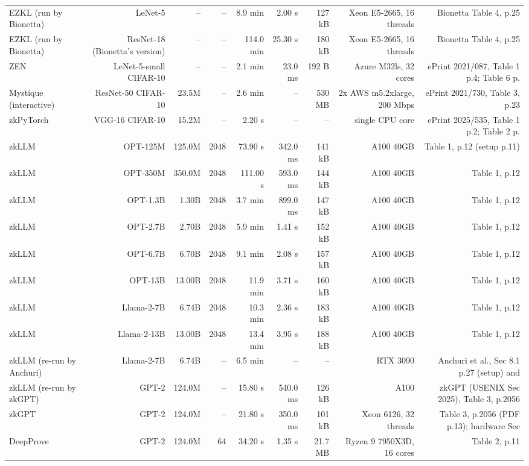 \begin{tabular}{lrrrrrrrr}
EZKL (run by Bionetta) & LeNet-5 & – & – & 8.9 min & 2.00 s & 127 kB & Xeon E5-2665, 16 threads & Bionetta Table 4, p.25 \\
EZKL (run by Bionetta) & ResNet-18 (Bionetta's version) & – & – & 114.0 min & 25.30 s & 180 kB & Xeon E5-2665, 16 threads & Bionetta Table 4, p.25 \\
ZEN & LeNet-5-small CIFAR-10 & – & – & 2.1 min & 23.0 ms & 192 B & Azure M32ls, 32 cores & ePrint 2021/087, Table 1 p.4; Table 6 p. \\
Mystique (interactive) & ResNet-50 CIFAR-10 & 23.5M & – & 2.6 min & – & 530 MB & 2x AWS m5.2xlarge, 200 Mbps & ePrint 2021/730, Table 3, p.23 \\
zkPyTorch & VGG-16 CIFAR-10 & 15.2M & – & 2.20 s & – & – & single CPU core & ePrint 2025/535, Table 1 p.2; Table 2 p. \\
zkLLM & OPT-125M & 125.0M & 2048 & 73.90 s & 342.0 ms & 141 kB & A100 40GB & Table 1, p.12 (setup p.11) \\
zkLLM & OPT-350M & 350.0M & 2048 & 111.00 s & 593.0 ms & 144 kB & A100 40GB & Table 1, p.12 \\
zkLLM & OPT-1.3B & 1.30B & 2048 & 3.7 min & 899.0 ms & 147 kB & A100 40GB & Table 1, p.12 \\
zkLLM & OPT-2.7B & 2.70B & 2048 & 5.9 min & 1.41 s & 152 kB & A100 40GB & Table 1, p.12 \\
zkLLM & OPT-6.7B & 6.70B & 2048 & 9.1 min & 2.08 s & 157 kB & A100 40GB & Table 1, p.12 \\
zkLLM & OPT-13B & 13.00B & 2048 & 11.9 min & 3.71 s & 160 kB & A100 40GB & Table 1, p.12 \\
zkLLM & Llama-2-7B & 6.74B & 2048 & 10.3 min & 2.36 s & 183 kB & A100 40GB & Table 1, p.12 \\
zkLLM & Llama-2-13B & 13.00B & 2048 & 13.4 min & 3.95 s & 188 kB & A100 40GB & Table 1, p.12 \\
zkLLM (re-run by Anchuri) & Llama-2-7B & 6.74B & – & 6.5 min & – & – & RTX 3090 & Anchuri et al., Sec 8.1 p.27 (setup) and \\
zkLLM (re-run by zkGPT) & GPT-2 & 124.0M & – & 15.80 s & 540.0 ms & 126 kB & A100 & zkGPT (USENIX Sec 2025), Table 3, p.2056 \\
zkGPT & GPT-2 & 124.0M & – & 21.80 s & 350.0 ms & 101 kB & Xeon 6126, 32 threads & Table 3, p.2056 (PDF p.13); hardware Sec \\
DeepProve & GPT-2 & 124.0M & 64 & 34.20 s & 1.35 s & 21.7 MB & Ryzen 9 7950X3D, 16 cores & Table 2, p.11 \\

\end{tabular}
